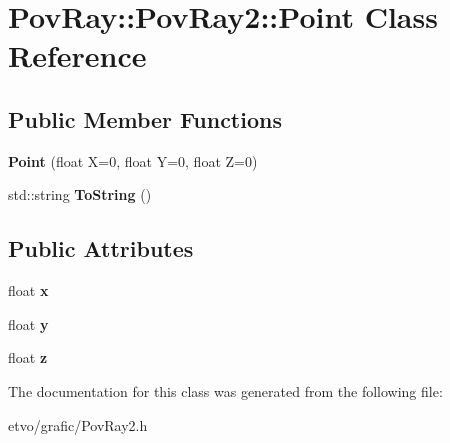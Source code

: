 \hypertarget{class_pov_ray_1_1_pov_ray2_1_1_point}{}\section{Pov\+Ray\+:\+:Pov\+Ray2\+:\+:Point Class Reference}
\label{class_pov_ray_1_1_pov_ray2_1_1_point}
\subsection*{Public Member Functions}
\begin{DoxyCompactItemize}
\item 
\mbox{\label{class_pov_ray_1_1_pov_ray2_1_1_point_aaad775e15b0968f3a4b8991aa1c67c77}} 
{\bfseries Point} (float X=0, float Y=0, float Z=0)
\item 
\mbox{\label{class_pov_ray_1_1_pov_ray2_1_1_point_aab7b20ba9e713159f1f54f0685a64a42}} 
std\+::string {\bfseries To\+String} ()
\end{DoxyCompactItemize}
\subsection*{Public Attributes}
\begin{DoxyCompactItemize}
\item 
\mbox{\label{class_pov_ray_1_1_pov_ray2_1_1_point_ae263d2db95131761a3210715e5a2c4f5}} 
float {\bfseries x}
\item 
\mbox{\label{class_pov_ray_1_1_pov_ray2_1_1_point_affc0692adeada35a2c4578bad78ae8e1}} 
float {\bfseries y}
\item 
\mbox{\label{class_pov_ray_1_1_pov_ray2_1_1_point_ad5362439150ce1146f38a0bd847a3584}} 
float {\bfseries z}
\end{DoxyCompactItemize}


The documentation for this class was generated from the following file\+:\begin{DoxyCompactItemize}
\item 
etvo/grafic/Pov\+Ray2.\+h\end{DoxyCompactItemize}
